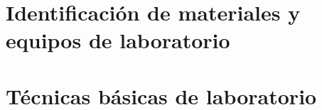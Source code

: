

\section{Identificación de materiales y equipos de laboratorio}



\section{Técnicas básicas de laboratorio}


